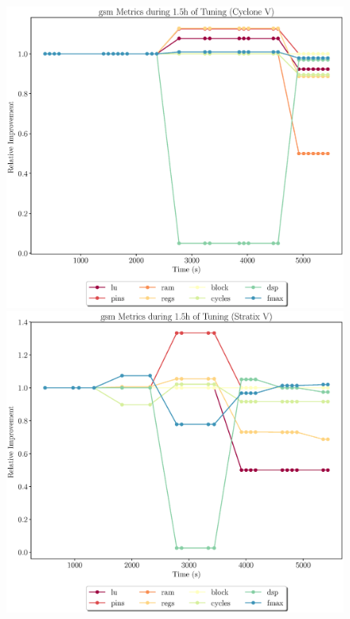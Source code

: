 \documentclass[12pt, a4paper]{article}
\begin{document}
\newpage

\begin{figure}[htpb]
    \centering
    \begin{minipage}{.48\textwidth}
        \includegraphics[scale=.25]{gsm_all_5400_chstone_CycloneV}
    \end{minipage}%
    \hfill
    \begin{minipage}{.48\textwidth}
        \includegraphics[scale=.25]{gsm_all_5400_chstone_StratixV}
    \end{minipage}%


\end{figure}
\end{document}
